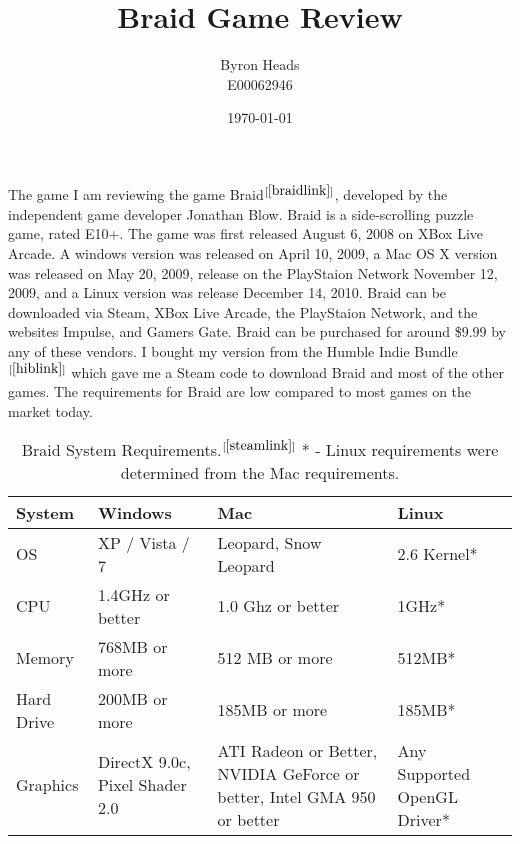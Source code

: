 \documentclass[a4paper,12pt]{report}
\title{Braid Game Review}
\author{Byron Heads \\
		E00062946}
\date{\today}
\begin{document}
\maketitle

\section*{}
The game I am reviewing the game Braid$^{[\ref{braidlink}]}$, developed by the independent game developer Jonathan Blow.  Braid is a side-scrolling puzzle game, rated E10+.  The game was first released August 6, 2008 on XBox Live Arcade.  A windows version was released on April 10, 2009, a Mac OS X version was released on May 20, 2009, release on the PlayStaion Network November 12, 2009, and a Linux version was release December 14, 2010.  Braid can be downloaded via Steam, XBox Live Arcade, the PlayStaion Network, and the websites Impulse, and Gamers Gate.  Braid can be purchased for around \$$9.99$ by any of these vendors.  I bought my version from the Humble Indie Bundle$^{[\ref{hiblink}]}$ which gave me a Steam code to download Braid and most of the other games.  The requirements for Braid are low compared to most games on the market today.

\begin{table}[hp!]
    \caption{Braid System Requirements.$^{[\ref{steamlink}]}$
    * - Linux requirements were determined from the Mac requirements.  }
    \begin{tabular}{|l|p{3cm}|p{3.5cm}|p{3cm}|}
        \hline
        System & Windows & Mac & Linux \\
        \hline
        OS & XP / Vista / 7 & Leopard, Snow Leopard & 2.6 Kernel* \\
        \hline
        CPU & 1.4GHz or better & 1.0 Ghz or better & 1GHz* \\
        \hline
        Memory & 768MB or more & 512 MB or more &  512MB*\\
        \hline
            Hard Drive & 200MB or more & 185MB or more & 185MB* \\
            \hline
            Graphics & DirectX 9.0c, Pixel Shader 2.0 & ATI Radeon\texttrademark 9500 or Better, NVIDIA GeForce\texttrademark 5900 or better, Intel GMA 950 or better & Any Supported OpenGL Driver* \\ 
            \hline
        \end{tabular}
\end{table}
\end{document}
